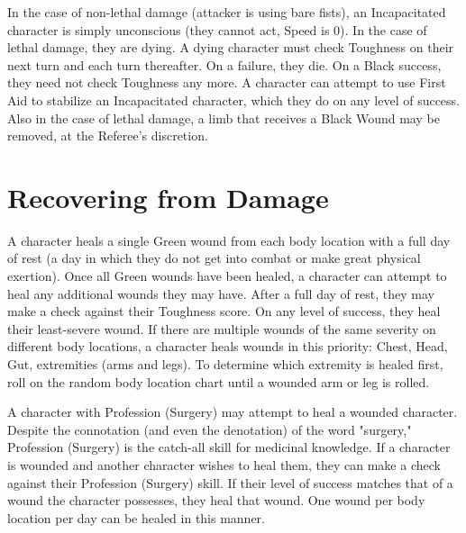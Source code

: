 \documentclass[oneside]{book}
\begin{document}
\begin{multicols}{2}
\begin{center}
\end{center}

In the case of non-lethal damage (attacker is using bare fists), an Incapacitated character is simply unconscious (they cannot act, Speed is 0). In the case of lethal damage, they are dying. A dying character must check Toughness on their next turn and each turn thereafter. On a failure, they die. On a Black success, they need not check Toughness any more. A character can attempt to use First Aid to stabilize an Incapacitated character, which they do on any level of success. Also in the case of lethal damage, a limb that receives a Black Wound may be removed, at the Referee's discretion. 

\section{Recovering from Damage}
A character heals a single Green wound from each body location with a full day of rest (a day in which they do not get into combat or make great physical exertion). Once all Green wounds have been healed, a character can attempt to heal any additional wounds they may have. After a full day of rest, they may make a check against their Toughness score. On any level of success, they heal their least-severe wound. If there are multiple wounds of the same severity on different body locations, a character heals wounds in this priority: Chest, Head, Gut, extremities (arms and legs). To determine which extremity is healed first, roll on the random body location chart until a wounded arm or leg is rolled. 

A character with Profession (Surgery) may attempt to heal a wounded character. Despite the connotation (and even the denotation) of the word "surgery," Profession (Surgery) is the catch-all skill for medicinal knowledge. If a character is wounded and another character wishes to heal them, they can make a check against their Profession (Surgery) skill. If their level of success matches that of a wound the character possesses, they heal that wound. One wound per body location per day can be healed in this manner.


\end{multicols}
\end{document}

